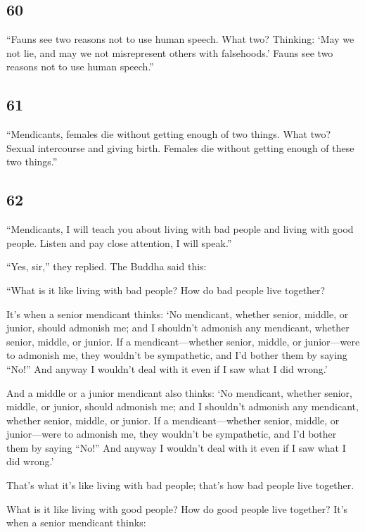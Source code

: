 \documentclass[12pt,openany]{book}%
\begin{document}
\subsection*{60 }

“Fauns see two reasons not to use human speech. What two? Thinking: ‘May we not lie, and may we not misrepresent others with falsehoods.’ Fauns see two reasons not to use human speech.” 

\subsection*{61 }

“Mendicants, females die without getting enough of two things. What two? Sexual intercourse and giving birth. Females die without getting enough of these two things.” 

\subsection*{62 }

“Mendicants, I will teach you about living with bad people and living with good people. Listen and pay close attention, I will speak.” 

“Yes, sir,” they replied. The Buddha said this: 

“What is it like living with bad people? How do bad people live together? 

It’s when a senior mendicant thinks: ‘No mendicant, whether senior, middle, or junior, should admonish me; and I shouldn’t admonish any mendicant, whether senior, middle, or junior. If a mendicant—whether senior, middle, or junior—were to admonish me, they wouldn’t be sympathetic, and I’d bother them by saying “No!” And anyway I wouldn’t deal with it even if I saw what I did wrong.’ 

And a middle or a junior mendicant also thinks: ‘No mendicant, whether senior, middle, or junior, should admonish me; and I shouldn’t admonish any mendicant, whether senior, middle, or junior. If a mendicant—whether senior, middle, or junior—were to admonish me, they wouldn’t be sympathetic, and I’d bother them by saying “No!” And anyway I wouldn’t deal with it even if I saw what I did wrong.’ 

That’s what it’s like living with bad people; that’s how bad people live together. 

What is it like living with good people? How do good people live together? It’s when a senior mendicant thinks: 
\end{document}
